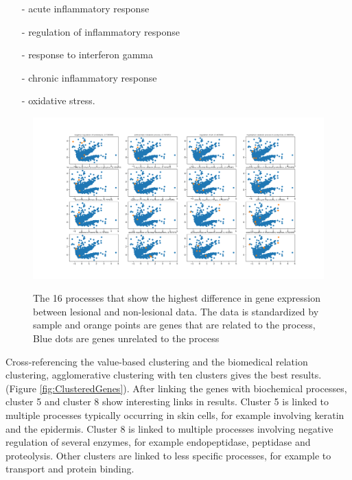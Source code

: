 \documentclass[10pt,a4paper]{article}
\begin{document}
	\begin{enumerate}
		\item[-] acute inflammatory response
		\item[-] regulation of inflammatory response 
		\item[-] response to interferon gamma 
		\item[-] chronic inflammatory response
		\item[-] oxidative stress.
	\end{enumerate}
	
	\begin{figure}[H]
	\includegraphics[width=1\textwidth]{Sign_Processes_Psoriasis.png}
	\label{fig:ProcessesScaledBySample}
	\caption{The 16 processes that show the highest difference in gene expression between lesional and non-lesional data. The data is standardized by sample and orange points are genes that are related to the process, Blue dots are genes unrelated to the process}
\end{figure}	
	
	Cross-referencing the value-based clustering and the biomedical relation clustering, agglomerative clustering with ten clusters gives the best results.(Figure \ref{fig:ClusteredGenes}). After linking the genes with biochemical processes, cluster 5 and cluster 8 show interesting links in results. Cluster 5 is linked to multiple processes typically occurring in skin cells, for example involving keratin and the epidermis. Cluster 8 is linked to multiple processes involving negative regulation of several enzymes, for example endopeptidase, peptidase and proteolysis. Other clusters are linked to less specific processes, for example to transport and protein binding.
	
\end{document}
